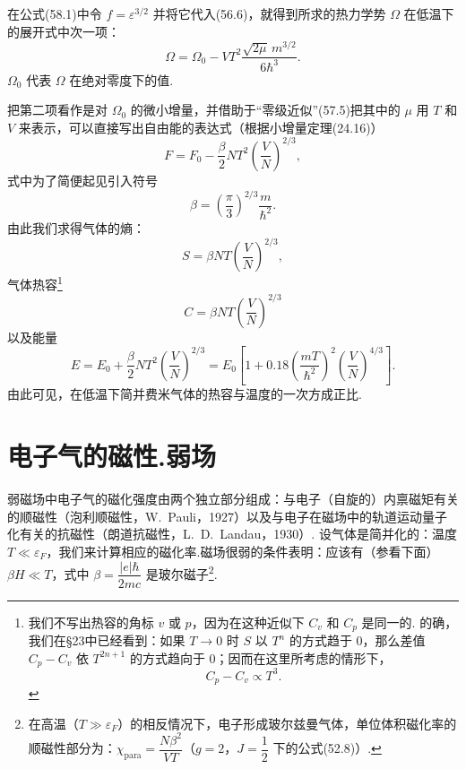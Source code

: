在公式(58.1)中令 $f=\varepsilon^{3/2}$ 并将它代入(56.6)，就得到所求的热力学势 $\Omega$ 在低温下的展开式中次一项：
\begin{equation}
  \Omega=\Omega_0-VT^2\frac{\sqrt{2\mu}\,m^{3/2}}{6\hbar^3}.
\end{equation}
$\Omega_0$ 代表 $\Omega$ 在绝对零度下的值.

把第二项看作是对 $\Omega_0$ 的微小增量，并借助于“零级近似”(57.5)把其中的 $\mu$ 用 $T$ 和 $V$ 来表示，可以直接写出自由能的表达式（根据小增量定理(24.16)）
\begin{equation}
  F=F_0-\frac{\beta}{2}NT^2\left(\frac{V}{N}\right)^{2/3},
\end{equation}
式中为了简便起见引入符号
\begin{equation}
  \beta=\left(\frac{\pi}{3}\right)^{2/3}\frac{m}{\hbar^2}.
\end{equation}
由此我们求得气体的熵：
\begin{equation}
  S=\beta NT\left(\frac{V}{N}\right)^{2/3},
\end{equation}
气体热容\footnote{我们不写出热容的角标 $v$ 或 $p$，因为在这种近似下 $C_v$ 和 $C_p$ 是同一的. 的确，我们在§23中已经看到：如果 $T\to0$ 时 $S$ 以 $T^n$ 的方式趋于 0，那么差值 $C_p-C_v$ 依 $T^{2n+1}$ 的方式趋向于 0；因而在这里所考虑的情形下，
\begin{equation*}
  C_p-C_v\propto T^3.
\end{equation*}}
\begin{equation}
  C=\beta NT\left(\frac{V}{N}\right)^{2/3}
\end{equation}
以及能量
\begin{equation}
  E=E_0+\frac{\beta}{2}NT^2\left(\frac{V}{N}\right)^{2/3}
  =E_0\left[1+0.18\left(\frac{mT}{\hbar^2}\right)^2\left(\frac{V}{N}\right)^{4/3}\right].
\end{equation}
由此可见，在低温下简并费米气体的热容与温度的一次方成正比.

\section{电子气的磁性.弱场}

弱磁场中电子气的磁化强度由两个独立部分组成：与电子（自旋的）内禀磁矩有关的顺磁性（泡利顺磁性，W.~Pauli，1927）以及与电子在磁场中的轨道运动量子化有关的抗磁性（朗道抗磁性，L.~D.~Landau，1930）. 设气体是简并化的：温度 $T\ll\varepsilon_F$，我们来计算相应的磁化率.磁场很弱的条件表明：应该有（参看下面）$\beta H\ll T$，式中 $\beta=\dfrac{|e|\hbar}{2mc}$ 是玻尔磁子\footnote{在高温（$T\gg\varepsilon_F$）的相反情况下，电子形成玻尔兹曼气体，单位体积磁化率的顺磁性部分为：$\chi_{\mathrm{para}}=\dfrac{N\beta^2}{VT}$（$g=2$，$J=\dfrac{1}{2}$ 下的公式(52.8)）.}.

